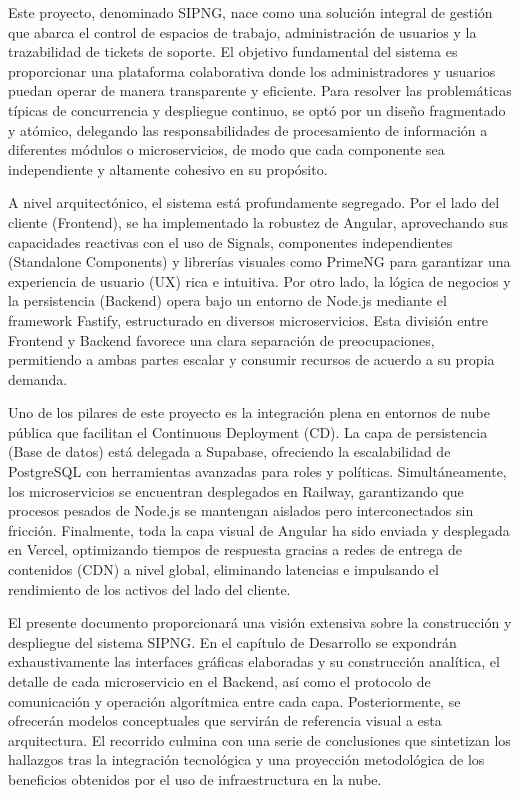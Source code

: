 \documentclass[12pt,a4paper]{report}
\begin{document}
Este proyecto, denominado SIPNG, nace como una solución integral de gestión que abarca el control de espacios de trabajo, administración de usuarios y la trazabilidad de tickets de soporte. El objetivo fundamental del sistema es proporcionar una plataforma colaborativa donde los administradores y usuarios puedan operar de manera transparente y eficiente. Para resolver las problemáticas típicas de concurrencia y despliegue continuo, se optó por un diseño fragmentado y atómico, delegando las responsabilidades de procesamiento de información a diferentes módulos o microservicios, de modo que cada componente sea independiente y altamente cohesivo en su propósito.

A nivel arquitectónico, el sistema está profundamente segregado. Por el lado del cliente (Frontend), se ha implementado la robustez de Angular, aprovechando sus capacidades reactivas con el uso de Signals, componentes independientes (Standalone Components) y librerías visuales como PrimeNG para garantizar una experiencia de usuario (UX) rica e intuitiva. Por otro lado, la lógica de negocios y la persistencia (Backend) opera bajo un entorno de Node.js mediante el framework Fastify, estructurado en diversos microservicios. Esta división entre Frontend y Backend favorece una clara separación de preocupaciones, permitiendo a ambas partes escalar y consumir recursos de acuerdo a su propia demanda.

Uno de los pilares de este proyecto es la integración plena en entornos de nube pública que facilitan el Continuous Deployment (CD). La capa de persistencia (Base de datos) está delegada a Supabase, ofreciendo la escalabilidad de PostgreSQL con herramientas avanzadas para roles y políticas. Simultáneamente, los microservicios se encuentran desplegados en Railway, garantizando que procesos pesados de Node.js se mantengan aislados pero interconectados sin fricción. Finalmente, toda la capa visual de Angular ha sido enviada y desplegada en Vercel, optimizando tiempos de respuesta gracias a redes de entrega de contenidos (CDN) a nivel global, eliminando latencias e impulsando el rendimiento de los activos del lado del cliente.

El presente documento proporcionará una visión extensiva sobre la construcción y despliegue del sistema SIPNG. En el capítulo de Desarrollo se expondrán exhaustivamente las interfaces gráficas elaboradas y su construcción analítica, el detalle de cada microservicio en el Backend, así como el protocolo de comunicación y operación algorítmica entre cada capa. Posteriormente, se ofrecerán modelos conceptuales que servirán de referencia visual a esta arquitectura. El recorrido culmina con una serie de conclusiones que sintetizan los hallazgos tras la integración tecnológica y una proyección metodológica de los beneficios obtenidos por el uso de infraestructura en la nube.
\end{document}
